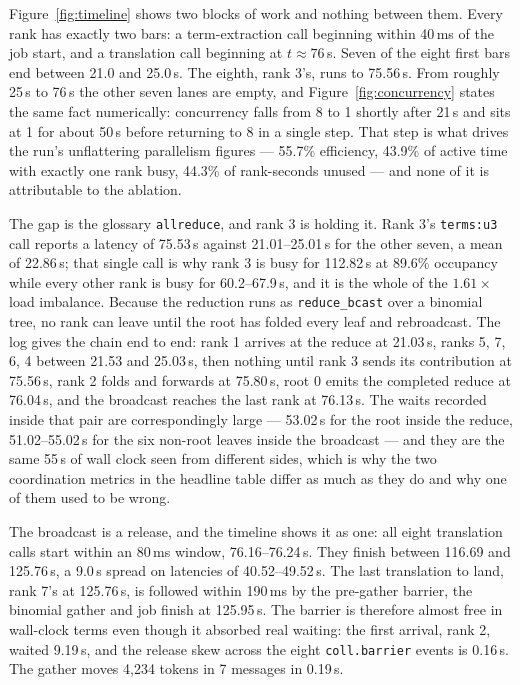 \documentclass[11pt]{article}
\begin{document}
Figure~\ref{fig:timeline} shows two blocks of work and nothing between them. Every rank has exactly
two bars: a term-extraction call beginning within 40\,ms of the job start, and a translation call
beginning at $t\approx76$\,s. Seven of the eight first bars end between 21.0 and 25.0\,s. The eighth,
rank 3's, runs to 75.56\,s. From roughly 25\,s to 76\,s the other seven lanes are empty, and
Figure~\ref{fig:concurrency} states the same fact numerically: concurrency falls from 8 to 1 shortly
after 21\,s and sits at 1 for about 50\,s before returning to 8 in a single step. That step is what
drives the run's unflattering parallelism figures --- 55.7\% efficiency, 43.9\% of active time with
exactly one rank busy, 44.3\% of rank-seconds unused --- and none of it is attributable to the
ablation.

The gap is the glossary \texttt{allreduce}, and rank 3 is holding it. Rank 3's
\texttt{terms:u3} call reports a latency of 75.53\,s against 21.01--25.01\,s for the other seven, a
mean of 22.86\,s; that single call is why rank 3 is busy for 112.82\,s at 89.6\% occupancy while every
other rank is busy for 60.2--67.9\,s, and it is the whole of the $1.61\times$ load imbalance. Because
the reduction runs as \texttt{reduce\_bcast} over a binomial tree, no rank can leave until the root
has folded every leaf and rebroadcast. The log gives the chain end to end: rank 1 arrives at the
reduce at 21.03\,s, ranks 5, 7, 6, 4 between 21.53 and 25.03\,s, then nothing until rank 3 sends its
contribution at 75.56\,s, rank 2 folds and forwards at 75.80\,s, root 0 emits the completed reduce at
76.04\,s, and the broadcast reaches the last rank at 76.13\,s. The waits recorded inside that pair are
correspondingly large --- 53.02\,s for the root inside the reduce, 51.02--55.02\,s for the six
non-root leaves inside the broadcast --- and they are the same 55\,s of wall clock seen from
different sides, which is why the two coordination metrics in the headline table differ as much as
they do and why one of them used to be wrong.

The broadcast is a release, and the timeline shows it as one: all eight translation calls start
within an 80\,ms window, 76.16--76.24\,s. They finish between 116.69 and 125.76\,s, a 9.0\,s spread on
latencies of 40.52--49.52\,s. The last translation to land, rank 7's at 125.76\,s, is followed within
190\,ms by the pre-gather barrier, the binomial gather and job finish at 125.95\,s. The barrier is
therefore almost free in wall-clock terms even though it absorbed real waiting: the first arrival,
rank 2, waited 9.19\,s, and the release skew across the eight \texttt{coll.barrier} events is 0.16\,s.
The gather moves 4,234 tokens in 7 messages in 0.19\,s.
\end{document}
